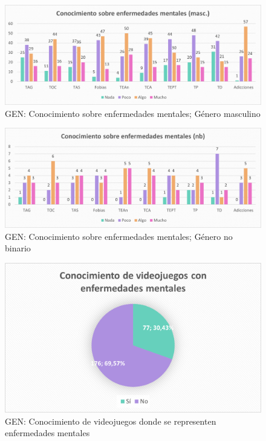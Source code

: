 \documentclass[12pt, a4paper,twoside,titlepage]{book}
\begin{document}
\begin{figure}
    \centering
    \includegraphics[width=1\linewidth]{ANEXO Gen/12AnexGENCongmasc}
    \caption{GEN: Conocimiento sobre enfermedades mentales; Género masculino}
  \label{fig:GENConmasc}
\end{figure}
\begin{figure}
    \centering
    \includegraphics[width=1\linewidth]{ANEXO Gen/13AnexGENConnb}
    \caption{GEN: Conocimiento sobre enfermedades mentales; Género no binario}
    \label{fig:GENConnb}
\end{figure}



\begin{figure}
    \centering
    \includegraphics[width=.8\linewidth]{ANEXO Gen/14AnexGENConvid}
    \caption{GEN: Conocimiento de videojuegos donde se representen enfermedades mentales}
     \label{fig:GENVid}
\end{figure}
\end{document}
